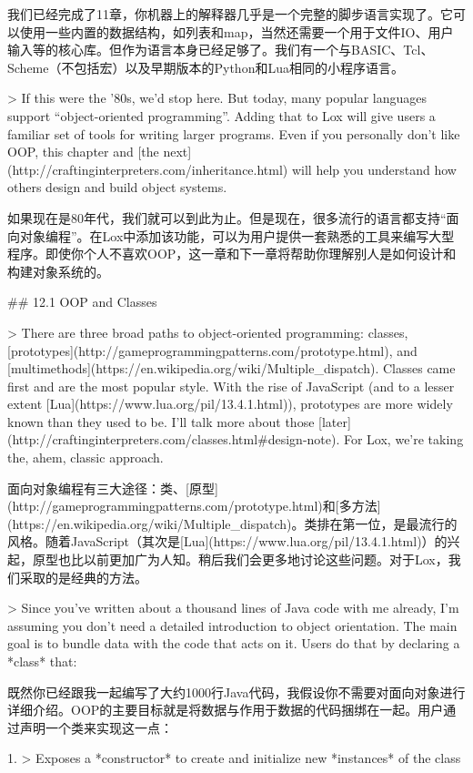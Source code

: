 \documentclass[cn,11pt,chinese]{elegantbook}
\begin{document}
{{我们已经完成了11章，你机器上的解释器几乎是一个完整的脚步语言实现了。它可以使用一些内置的数据结构，如列表和map，当然还需要一个用于文件IO、用户输入等的核心库。但作为语言本身已经足够了。我们有一个与BASIC、Tcl、Scheme（不包括宏）以及早期版本的Python和Lua相同的小程序语言。

> If this were the ’80s, we’d stop here. But today, many popular languages support “object-oriented programming”. Adding that to Lox will give users a familiar set of tools for writing larger programs. Even if you personally don’t like OOP, this chapter and [the next](http://craftinginterpreters.com/inheritance.html) will help you understand how others design and build object systems.

如果现在是80年代，我们就可以到此为止。但是现在，很多流行的语言都支持“面向对象编程”。在Lox中添加该功能，可以为用户提供一套熟悉的工具来编写大型程序。即使你个人不喜欢OOP，这一章和下一章将帮助你理解别人是如何设计和构建对象系统的。

## 12.1 OOP and Classes

> There are three broad paths to object-oriented programming: classes, [prototypes](http://gameprogrammingpatterns.com/prototype.html), and [multimethods](https://en.wikipedia.org/wiki/Multiple_dispatch). Classes came first and are the most popular style. With the rise of JavaScript (and to a lesser extent [Lua](https://www.lua.org/pil/13.4.1.html)), prototypes are more widely known than they used to be. I’ll talk more about those [later](http://craftinginterpreters.com/classes.html#design-note). For Lox, we’re taking the, ahem, classic approach.

面向对象编程有三大途径：类、[原型](http://gameprogrammingpatterns.com/prototype.html)和[多方法](https://en.wikipedia.org/wiki/Multiple_dispatch)。类排在第一位，是最流行的风格。随着JavaScript（其次是[Lua](https://www.lua.org/pil/13.4.1.html)）的兴起，原型也比以前更加广为人知。稍后我们会更多地讨论这些问题。对于Lox，我们采取的是经典的方法。

> Since you’ve written about a thousand lines of Java code with me already, I’m assuming you don’t need a detailed introduction to object orientation. The main goal is to bundle data with the code that acts on it. Users do that by declaring a *class* that:

既然你已经跟我一起编写了大约1000行Java代码，我假设你不需要对面向对象进行详细介绍。OOP的主要目标就是将数据与作用于数据的代码捆绑在一起。用户通过声明一个类来实现这一点：

1. > Exposes a *constructor* to create and initialize new *instances* of the class

}}
\end{document}
